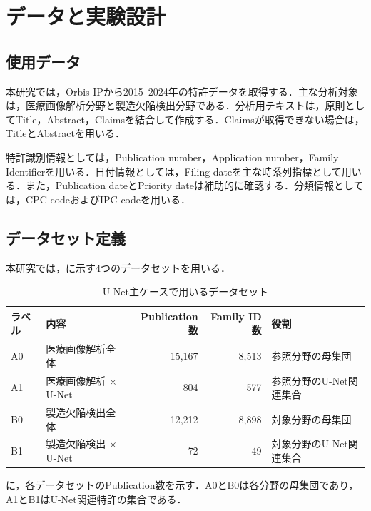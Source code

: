 \chapter{データと実験設計}

\section{使用データ}
本研究では，Orbis IPから2015--2024年の特許データを取得する．主な分析対象は，医療画像解析分野と製造欠陥検出分野である．分析用テキストは，原則としてTitle，Abstract，Claimsを結合して作成する．Claimsが取得できない場合は，TitleとAbstractを用いる．

特許識別情報としては，Publication number，Application number，Family Identifierを用いる．日付情報としては，Filing dateを主な時系列指標として用いる．また，Publication dateとPriority dateは補助的に確認する．分類情報としては，CPC codeおよびIPC codeを用いる．

\section{データセット定義}
本研究では，に示す4つのデータセットを用いる．

\begin{table}[htbp]
  \centering
  \caption{U-Net主ケースで用いるデータセット}
  \label{tab:dataset_definition}
  \begin{tabularx}{\textwidth}{p{20mm}X r r X}
    \toprule
    ラベル & 内容 & Publication数 & Family ID数 & 役割 \\
    \midrule
    A0 & 医療画像解析全体 & 15,167 & 8,513 & 参照分野の母集団 \\
    A1 & 医療画像解析 $\times$ U-Net & 804 & 577 & 参照分野のU-Net関連集合 \\
    B0 & 製造欠陥検出全体 & 12,212 & 8,898 & 対象分野の母集団 \\
    B1 & 製造欠陥検出 $\times$ U-Net & 72 & 49 & 対象分野のU-Net関連集合 \\
    \bottomrule
  \end{tabularx}
\end{table}

に，各データセットのPublication数を示す．A0とB0は各分野の母集団であり，A1とB1はU-Net関連特許の集合である．

